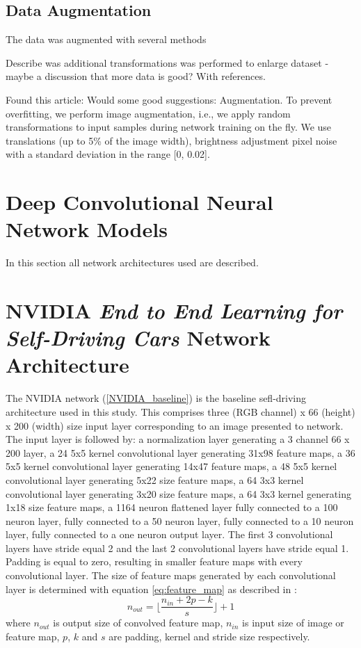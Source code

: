 \subsection{Data Augmentation}
The data was augmented with several methods

Describe was additional transformations was performed to enlarge dataset - maybe a discussion that more data is good? With references.


Found this article:
Would some good suggestions:  
Augmentation. To prevent overfitting, we perform image augmentation, i.e., we
apply random transformations to input samples during network training on the
fly. We use translations (up to 5\% of the image width), brightness adjustment
pixel noise with a standard deviation in the range [0, 0.02].
  
\section{Deep Convolutional Neural Network Models}

In this section all network architectures used are described.

\section{NVIDIA \textit{End to End Learning for Self-Driving Cars} Network Architecture}

The NVIDIA network (\ref{NVIDIA_baseline}) is the baseline sefl-driving architecture used in this study. This comprises three (RGB channel) x 66 (height) x 200 (width) size input layer corresponding to an image presented to network. The input layer is followed by: a normalization layer generating a 3 channel 66 x 200 layer, a 24 5x5 kernel convolutional layer generating 31x98 feature maps, a 36 5x5 kernel convolutional layer generating 14x47 feature maps, a 48 5x5 kernel convolutional layer generating 5x22 size feature maps, a 64 3x3 kernel convolutional layer generating 3x20 size feature maps, a 64 3x3 kernel generating 1x18 size feature maps, a 1164 neuron flattened layer fully connected to a 100 neuron layer, fully connected to a 50 neuron layer, fully connected to a 10 neuron layer, fully connected to a one neuron output layer.  
The first 3 convolutional layers have stride equal 2 and the last 2 convolutional layers have stride equal 1. Padding is equal to zero, resulting in smaller feature maps with every convolutional layer.
The size of feature maps generated by each convolutional layer is determined with equation \ref{eq:feature_map} as described in \cite{dumoulin2018guide}:
\begin{equation}
    \label{eq:feature_map}
    n_{out}= \Big\lfloor\frac{n_{in} + 2p -k}{s} \Big\rfloor +1
\end{equation}
where $n_{out}$ is output size of convolved feature map, $n_{in}$ is input size of image or feature map, $p$, $k$ and $s$ are padding, kernel and stride size respectively.  
 
